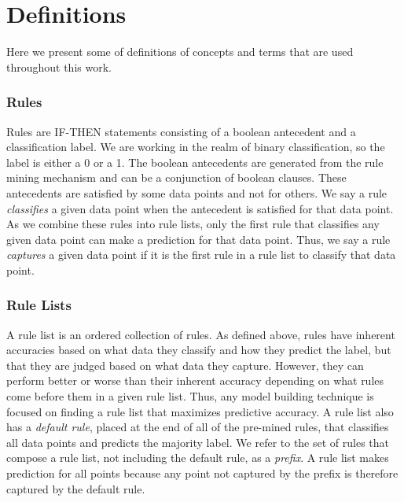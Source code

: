 \chapter{Definitions}
Here we present some of definitions of concepts and terms that are used throughout this work.

\subsection{Rules}
Rules are IF-THEN statements consisting of a boolean antecedent and a classification label.
We are working in the realm of binary classification, so the label is either a 0 or a 1.
The boolean antecedents are generated from the rule mining mechanism and can be a conjunction of boolean clauses.
These antecedents are satisfied by some data points and not for others.
We say a rule \textit{classifies} a given data point when the antecedent is satisfied for that data point.
As we combine these rules into rule lists, only the first rule that classifies any given data point can make a prediction for that data point.
Thus, we say a rule \textit{captures} a given data point if it is the first rule in a rule list to classify that data point.

\subsection{Rule Lists}
A rule list is an ordered collection of rules.
As defined above, rules have inherent accuracies based on what data they classify and how they predict the label, but that they are judged based on what data they capture.
However, they can perform better or worse than their inherent accuracy depending on what rules come before them in a given rule list.
Thus, any model building technique is focused on finding a rule list that maximizes predictive accuracy.
A rule list also has a \textit{default rule}, placed at the end of all of the pre-mined rules, that classifies all data points and predicts the majority label.
We refer to the set of rules that compose a rule list, not including the default rule, as a \textit{prefix}.
A rule list makes prediction for all points because any point not captured by the prefix is therefore captured by the default rule.

